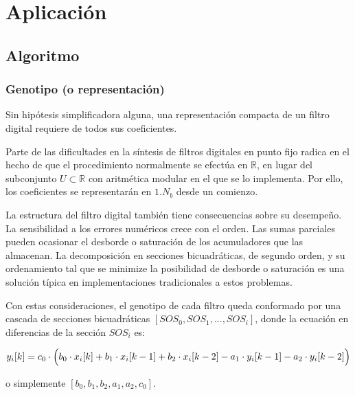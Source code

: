 \documentclass[11pt, journal]{IEEEtran}
\begin{document}
    \section{Aplicación}

    \subsection{Algoritmo}

\subsubsection{Genotipo (o representación)}

Sin hipótesis simplificadora alguna, una representación compacta de un
filtro digital requiere de todos sus coeficientes.

Parte de las dificultades en la síntesis de filtros digitales en punto
fijo radica en el hecho de que el procedimiento normalmente se efectúa
en \(\mathbb{R}\), en lugar del subconjunto \(U \subset \mathbb{R}\) con
aritmética modular en el que se lo implementa. Por ello, los
coeficientes se representarán en \(1.N_b\) desde un comienzo.

La estructura del filtro digital también tiene consecuencias sobre su
desempeño. La sensibilidad a los errores numéricos crece con el orden.
Las sumas parciales pueden ocasionar el desborde o saturación de los
acumuladores que las almacenan. La decomposición en secciones
bicuadráticas, de segundo orden, y su ordenamiento tal que se minimize
la posibilidad de desborde o saturación es una solución típica en
implementaciones tradicionales a estos problemas.

Con estas consideraciones, el genotipo de cada filtro queda conformado
por una cascada de secciones bicuadráticas
\([SOS_0, SOS_1, ..., SOS_i]\), donde la ecuación en diferencias de la
sección \(SOS_i\) es:


\begin{equation}
y_i[k] = c_0 \cdot \Bigl( b_0 \cdot x_i[k] + b_1 \cdot x_i[k-1] + b_2 \cdot x_i[k-2] - a_1 \cdot y_i[k-1] - a_2 \cdot y_i[k-2] \Bigr)
\end{equation}


o simplemente \([b_0, b_1, b_2, a_1, a_2, c_0]\).

    
    \begin{center}
    \end{center}
    { \hspace*{\fill} \\}
    
\end{document}
